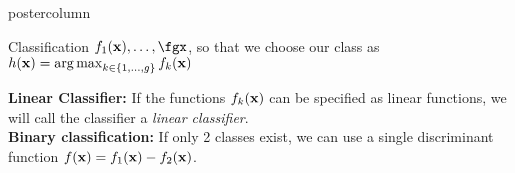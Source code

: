 \documentclass{beamer}
\begin{document}
\begin{frame}[fragile]{}
\begin{columns}
\begin{column}{.31\textwidth}
\begin{beamercolorbox}[center]{postercolumn}
\begin{minipage}{.98\textwidth}
{\begin{myblock}{Classification}
$f_1(\xv), \ldots, \fgx$, so that we choose our class as \\ 
 $h(\mathbf{x}) = \operatorname{arg\,max}_{k \in \{1, \ldots, g\}} f_{k}(\mathbf{x})$ 
  
  \vspace*{2ex}


\textbf{Linear Classifier:} If the functions $f_{k}(\mathbf{x})$ can be specified as linear functions, we will call 
the classifier a \emph{linear classifier}.\\


\textbf{Binary classification: }If only 2 classes exist, we can use a single discriminant function $f(\mathbf{x}) = f_{1}(\mathbf{x}) - f_{2}(\mathbf{x})$.  

\end{myblock}
			  }
			\end{minipage}
		\end{beamercolorbox}
	\end{column}
\end{columns}

\end{frame}
\end{document}
